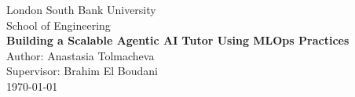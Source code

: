 \documentclass[12pt,a4paper]{report}
\begin{document}
\begin{titlepage}
    \centering
    {\Large London South Bank University}\\[1.2cm]
    {\large School of Engineering}\\[2.0cm]
    {\LARGE \textbf{Building a Scalable Agentic AI Tutor Using MLOps Practices}}\\[0.4cm]
    {Author: Anastasia Tolmacheva}\\[0.4cm]
    {Supervisor: Brahim El Boudani}\\[3cm]
    {\large \today}
\end{titlepage}

\clearpage
{}
\tableofcontents
\clearpage
{}









\clearpage
\printbibliography
\end{document}
